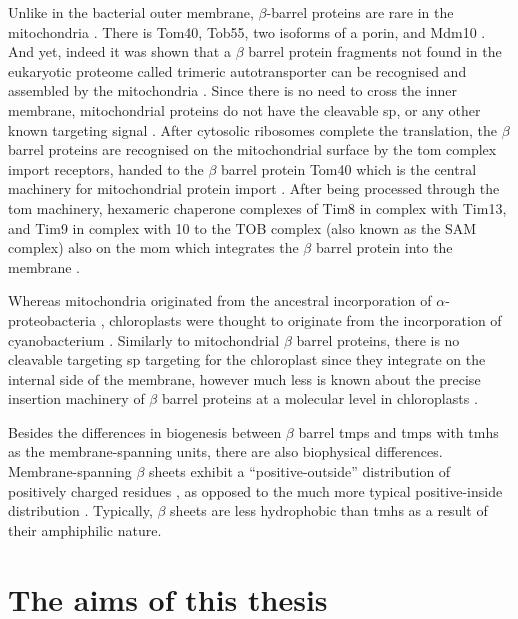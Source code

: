 Unlike in the bacterial outer membrane, $\beta$-barrel proteins are rare in the mitochondria \cite{Ulrich2015}.
There is Tom40, Tob55, two isoforms of a porin, and Mdm10 \cite{Ulrich2015}.
And yet, indeed it was shown that a $\beta$ barrel protein fragments not found in the eukaryotic proteome called trimeric autotransporter can be recognised and assembled by the mitochondria \cite{Muller2011}.
Since there is no need to cross the inner membrane, mitochondrial proteins do not have the cleavable \gls{sp}, or any other known targeting signal \cite{Ulrich2015}.
After cytosolic ribosomes complete the translation, the $\beta$ barrel proteins are recognised on the mitochondrial surface by the \gls{tom} complex import receptors, handed to the $\beta$ barrel protein Tom40 which is the central machinery for mitochondrial protein import \cite{Chacinska2009}.
After being processed through the \gls{tom} machinery, hexameric chaperone complexes of Tim8 in complex with Tim13, and Tim9 in complex with 10 to the TOB complex (also known as the SAM complex) also on the \gls{mom} which integrates the $\beta$ barrel protein into the membrane \cite{Wiedemann2003, Paschen2003, Gentle2004}.

Whereas mitochondria originated from the ancestral incorporation of $\alpha$\--proteobacteria \cite{Gray1999}, chloroplasts were thought to originate from the incorporation of cyanobacterium \cite{McFadden2001}.
Similarly to mitochondrial $\beta$ barrel proteins, there is no cleavable targeting \gls{sp} targeting for the chloroplast since they integrate on the internal side of the membrane, however much less is known about the precise insertion machinery of $\beta$ barrel proteins at a molecular level in chloroplasts \cite{Ulrich2015}.

Besides the differences in biogenesis between $\beta$ barrel \gls{tmp}s and \gls{tmp}s with \gls{tmh}s as the membrane\--spanning units, there are also biophysical differences.
Membrane\--spanning $\beta$ sheets exhibit a ``positive\--outside'' distribution of positively charged residues \cite{Pogozheva2013}, as opposed to the much more typical positive\--inside distribution \cite{VonHeijne1989, Andersson1992, Pogozheva2013, Sharpe2010, Baeza-Delgado2013}.
Typically, $\beta$ sheets are less hydrophobic than \gls{tmh}s \cite{Tamm2004} as a result of their amphiphilic nature.

\section{The aims of this thesis}

